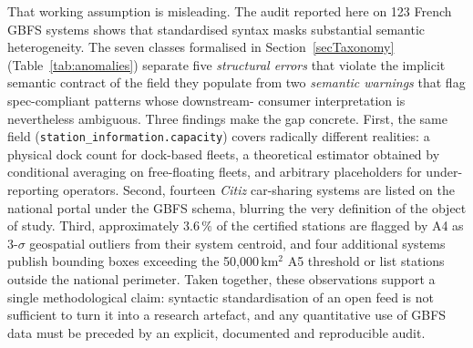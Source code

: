 \documentclass[11pt,a4paper]{article}
\begin{document}
That working assumption is misleading. The audit reported here on
123 French GBFS systems shows that standardised syntax masks
substantial semantic heterogeneity. The seven classes formalised
in Section~\ref{secTaxonomy} (Table~\ref{tab:anomalies}) separate
five \emph{structural errors} that violate the implicit semantic
contract of the field they populate from two \emph{semantic
warnings} that flag spec-compliant patterns whose downstream-
consumer interpretation is nevertheless ambiguous.
Three findings make the gap concrete. First, the same field
(\texttt{station\_information.capacity}) covers radically different
realities: a physical dock count for dock-based fleets, a theoretical
estimator obtained by conditional averaging on free-floating fleets, and
arbitrary placeholders for under-reporting operators. Second, fourteen
\emph{Citiz} car-sharing systems are listed on the national portal under
the GBFS schema, blurring the very definition of the object of study.
Third, approximately $3.6\,\%$ of the certified stations are flagged
by A4 as 3-$\sigma$ geospatial outliers from their system centroid,
and four additional systems publish bounding boxes exceeding the
50{,}000\,km$^2$ A5 threshold or list stations outside the national
perimeter.
Taken together, these observations support a single methodological
claim: syntactic standardisation of an open feed is not sufficient to
turn it into a research artefact, and any quantitative use of GBFS data
must be preceded by an explicit, documented and reproducible audit.
\end{document}
